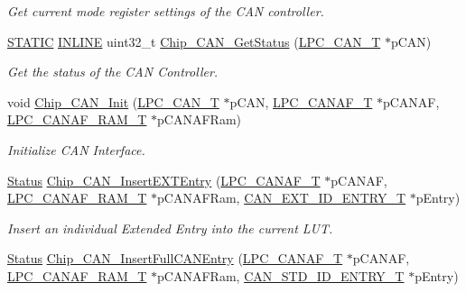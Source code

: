 \begin{DoxyCompactItemize}
\begin{DoxyCompactList}\small\item\em Get current mode register settings of the C\+AN controller. \end{DoxyCompactList}\item 
\hyperlink{group__LPC__Types__Public__Macros_ga10b2d890d871e1489bb02b7e70d9bdfb}{S\+T\+A\+T\+IC} \hyperlink{group__LPC__Types__Public__Types_ga2eb6f9e0395b47b8d5e3eeae4fe0c116}{I\+N\+L\+I\+NE} uint32\+\_\+t \hyperlink{group__CAN__17XX__40XX_gaa7142c33df0796bd194ba44629923b6d}{Chip\+\_\+\+C\+A\+N\+\_\+\+Get\+Status} (\hyperlink{structLPC__CAN__T}{L\+P\+C\+\_\+\+C\+A\+N\+\_\+T} $\ast$p\+C\+AN)
\begin{DoxyCompactList}\small\item\em Get the status of the C\+AN Controller. \end{DoxyCompactList}\item 
void \hyperlink{group__CAN__17XX__40XX_ga4995b9302885e0e577d4566d23c2ce37}{Chip\+\_\+\+C\+A\+N\+\_\+\+Init} (\hyperlink{structLPC__CAN__T}{L\+P\+C\+\_\+\+C\+A\+N\+\_\+T} $\ast$p\+C\+AN, \hyperlink{structLPC__CANAF__T}{L\+P\+C\+\_\+\+C\+A\+N\+A\+F\+\_\+T} $\ast$p\+C\+A\+N\+AF, \hyperlink{structLPC__CANAF__RAM__T}{L\+P\+C\+\_\+\+C\+A\+N\+A\+F\+\_\+\+R\+A\+M\+\_\+T} $\ast$p\+C\+A\+N\+A\+F\+Ram)
\begin{DoxyCompactList}\small\item\em Initialize C\+AN Interface. \end{DoxyCompactList}\item 
\hyperlink{group__LPC__Types__Public__Types_ga67a0db04d321a74b7e7fcfd3f1a3f70b}{Status} \hyperlink{group__CAN__17XX__40XX_gad6ce5875d9ca861b291a1fc2d91ba026}{Chip\+\_\+\+C\+A\+N\+\_\+\+Insert\+E\+X\+T\+Entry} (\hyperlink{structLPC__CANAF__T}{L\+P\+C\+\_\+\+C\+A\+N\+A\+F\+\_\+T} $\ast$p\+C\+A\+N\+AF, \hyperlink{structLPC__CANAF__RAM__T}{L\+P\+C\+\_\+\+C\+A\+N\+A\+F\+\_\+\+R\+A\+M\+\_\+T} $\ast$p\+C\+A\+N\+A\+F\+Ram, \hyperlink{structCAN__EXT__ID__ENTRY__T}{C\+A\+N\+\_\+\+E\+X\+T\+\_\+\+I\+D\+\_\+\+E\+N\+T\+R\+Y\+\_\+T} $\ast$p\+Entry)
\begin{DoxyCompactList}\small\item\em Insert an individual Extended Entry into the current L\+UT. \end{DoxyCompactList}\item 
\hyperlink{group__LPC__Types__Public__Types_ga67a0db04d321a74b7e7fcfd3f1a3f70b}{Status} \hyperlink{group__CAN__17XX__40XX_ga3666d1f79e2dcbf0f041205f27494bdf}{Chip\+\_\+\+C\+A\+N\+\_\+\+Insert\+Full\+C\+A\+N\+Entry} (\hyperlink{structLPC__CANAF__T}{L\+P\+C\+\_\+\+C\+A\+N\+A\+F\+\_\+T} $\ast$p\+C\+A\+N\+AF, \hyperlink{structLPC__CANAF__RAM__T}{L\+P\+C\+\_\+\+C\+A\+N\+A\+F\+\_\+\+R\+A\+M\+\_\+T} $\ast$p\+C\+A\+N\+A\+F\+Ram, \hyperlink{structCAN__STD__ID__ENTRY__T}{C\+A\+N\+\_\+\+S\+T\+D\+\_\+\+I\+D\+\_\+\+E\+N\+T\+R\+Y\+\_\+T} $\ast$p\+Entry)

\end{DoxyCompactItemize}
